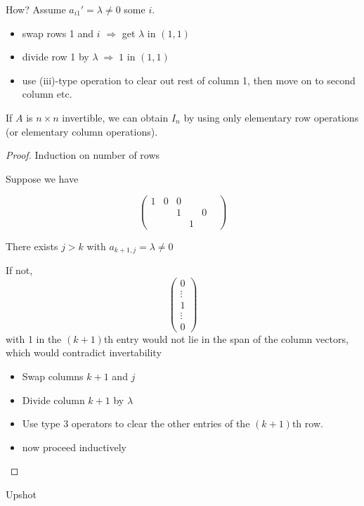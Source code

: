 \documentclass[a4paper]{article}
\begin{document}
How? Assume $ a_{i1}' = \lambda \neq 0 $ some $ i $.
\begin{itemize}
	\item swap rows 1 and $ i $ $ \Rightarrow $ get $ \lambda $ in $ (1,1) $
	\item divide row 1 by $ \lambda \; \Rightarrow \; 1 $ in $ (1,1) $
	\item use (iii)-type operation to clear out rest of column 1, then move on to second column etc.  
\end{itemize}

\begin{lemma} 
	If $ A $ is $ n \times n $ invertible, we can obtain $ I_{n} $ by using only elementary row operations (or elementary column operations).
\end{lemma}

\begin{proof}
	Induction on number of rows
	
	
	Suppose we have
	
	\[ \begin{pmatrix}
	1 & 0 & 0 & & &  \\
	& & 1 & & 0 & \\
	& & & 1 & & 
	\end{pmatrix} \]
	
	There exists $ j > k $ with $ a_{k+1,j} = \lambda \neq 0 $
	
	If not, 	\[ \begin{pmatrix}
	0 \\
	\vdots \\
	1 \\
	\vdots \\
	0
	\end{pmatrix} \] with 1 in the $ (k+1) $th entry would not lie in the span of the column vectors, which would contradict invertability
	
	
	\begin{itemize}
		\item Swap columns $ k+1 $ and $ j $
		\item Divide column $ k+1 $ by $ \lambda $
		\item Use type 3 operators to clear the other entries of the $ (k+1) $th row. 
		\item now proceed inductively
	\end{itemize}
	
	
	
\end{proof}

Upshot 
\end{document}
